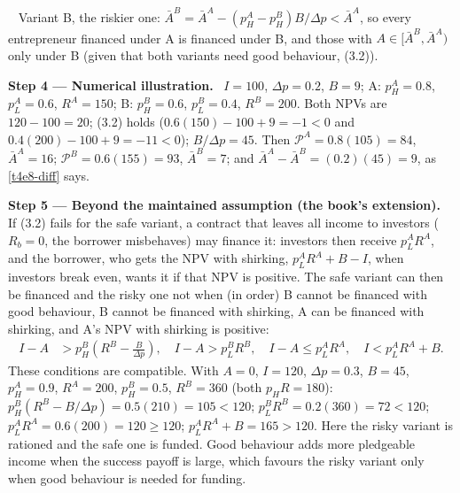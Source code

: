 \documentclass[11pt,a4paper]{article}
\newcommand{\step}[2]{\par\medskip\noindent\textbf{Step #1 --- #2.}~}
\newcommand{\answer}[1]{\par\smallskip\noindent\fbox{\textbf{Answer #1.}}~}
\begin{document}
\answer{(3.15)} Variant B, the riskier one: $\bar A^B=\bar A^A-(p_H^A-p_H^B)B/\Delta p<\bar A^A$, so
every entrepreneur financed under A is financed under B, and those with
$A\in[\bar A^B,\bar A^A)$ only under B (given that both variants need good behaviour, (3.2)).

\step{4}{Numerical illustration} $I=100$, $\Delta p=0.2$, $B=9$; A: $p_H^A=0.8$, $p_L^A=0.6$,
$R^A=150$; B: $p_H^B=0.6$, $p_L^B=0.4$, $R^B=200$. Both NPVs are $120-100=20$; (3.2) holds
($0.6(150)-100+9=-1<0$ and $0.4(200)-100+9=-11<0$); $B/\Delta p=45$. Then
$\mathcal P^A=0.8(105)=84$, $\bar A^A=16$; $\mathcal P^B=0.6(155)=93$, $\bar A^B=7$; and
$\bar A^A-\bar A^B=(0.2)(45)=9$, as \eqref{t4e8-diff} says.

\step{5}{Beyond the maintained assumption (the book's extension)} If (3.2) fails for the safe
variant, a contract that leaves all income to investors ($R_b=0$, the borrower misbehaves)
may finance it: investors then receive $p_L^AR^A$, and the borrower, who gets the NPV with
shirking, $p_L^AR^A+B-I$, when investors break even, wants it if that NPV is positive. The safe
variant can then be financed and the risky one not when (in order) B cannot be financed with good
behaviour, B cannot be financed with shirking, A can be financed with shirking, and A's NPV with
shirking is positive:
\begin{align}
  I-A &> p_H^B\left(R^B-\frac{B}{\Delta p}\right), \quad I-A>p_L^B R^B, \quad I-A\le p_L^A R^A, \quad I<p_L^A R^A+B. \label{t4e8-ext}
\end{align}
These conditions are compatible. With $A=0$, $I=120$, $\Delta p=0.3$, $B=45$, $p_H^A=0.9$,
$R^A=200$, $p_H^B=0.5$, $R^B=360$ (both $p_H R=180$): $p_H^B(R^B-B/\Delta p)=0.5(210)=105<120$;
$p_L^B R^B=0.2(360)=72<120$; $p_L^A R^A=0.6(200)=120\ge 120$; $p_L^A R^A+B=165>120$. Here the
risky variant is rationed and the safe one is funded. Good behaviour adds more pledgeable
income when the success payoff is large, which favours the risky variant only when good
behaviour is needed for funding.
\end{document}
